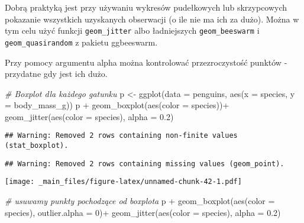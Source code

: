 \documentclass[
]{book}
\newenvironment{Shaded}{\begin{snugshade}}{\end{snugshade}}
\newcommand{\AttributeTok}[1]{\textcolor[rgb]{0.77,0.63,0.00}{#1}}
\newcommand{\CommentTok}[1]{\textcolor[rgb]{0.56,0.35,0.01}{\textit{#1}}}
\newcommand{\DecValTok}[1]{\textcolor[rgb]{0.00,0.00,0.81}{#1}}
\newcommand{\FloatTok}[1]{\textcolor[rgb]{0.00,0.00,0.81}{#1}}
\newcommand{\FunctionTok}[1]{\textcolor[rgb]{0.00,0.00,0.00}{#1}}
\newcommand{\NormalTok}[1]{#1}
\newcommand{\OtherTok}[1]{\textcolor[rgb]{0.56,0.35,0.01}{#1}}
\newcommand{\SpecialCharTok}[1]{\textcolor[rgb]{0.00,0.00,0.00}{#1}}
\begin{document}
Dobrą praktyką jest przy używaniu wykresów pudełkowych lub skrzypcowych pokazanie wszystkich uzyskanych obserwacji (o ile nie ma ich za dużo). Można w tym celu użyć funkcji \texttt{geom\_jitter} albo ładniejszych \texttt{geom\_beeswarm} i \texttt{geom\_quasirandom} z pakietu ggbeeswarm.

Przy pomocy argumentu alpha można kontrolować przezroczystość punktów - przydatne gdy jest ich dużo.

\begin{Shaded}
\begin{Highlighting}[]
\CommentTok{\# Boxplot dla każdego gatunku}
\NormalTok{p }\OtherTok{\textless{}{-}} \FunctionTok{ggplot}\NormalTok{(}\AttributeTok{data =}\NormalTok{ penguins, }\FunctionTok{aes}\NormalTok{(}\AttributeTok{x =}\NormalTok{ species, }\AttributeTok{y =}\NormalTok{ body\_mass\_g))}
\NormalTok{p }\SpecialCharTok{+} \FunctionTok{geom\_boxplot}\NormalTok{(}\FunctionTok{aes}\NormalTok{(}\AttributeTok{color =}\NormalTok{ species))}\SpecialCharTok{+}
  \FunctionTok{geom\_jitter}\NormalTok{(}\FunctionTok{aes}\NormalTok{(}\AttributeTok{color =}\NormalTok{ species), }\AttributeTok{alpha =} \FloatTok{0.2}\NormalTok{)}
\end{Highlighting}
\end{Shaded}

\begin{verbatim}
## Warning: Removed 2 rows containing non-finite values (stat_boxplot).
\end{verbatim}

\begin{verbatim}
## Warning: Removed 2 rows containing missing values (geom_point).
\end{verbatim}

\texttt{[image: \_main\_files/figure-latex/unnamed-chunk-42-1.pdf]}

\begin{Shaded}
\begin{Highlighting}[]
\CommentTok{\# usuwamy punkty pochodzące od boxplota}
\NormalTok{p }\SpecialCharTok{+} \FunctionTok{geom\_boxplot}\NormalTok{(}\FunctionTok{aes}\NormalTok{(}\AttributeTok{color =}\NormalTok{ species), }\AttributeTok{outlier.alpha =} \DecValTok{0}\NormalTok{)}\SpecialCharTok{+}
  \FunctionTok{geom\_jitter}\NormalTok{(}\FunctionTok{aes}\NormalTok{(}\AttributeTok{color =}\NormalTok{ species), }\AttributeTok{alpha =} \FloatTok{0.2}\NormalTok{)}
\end{Highlighting}
\end{Shaded}
\end{document}

